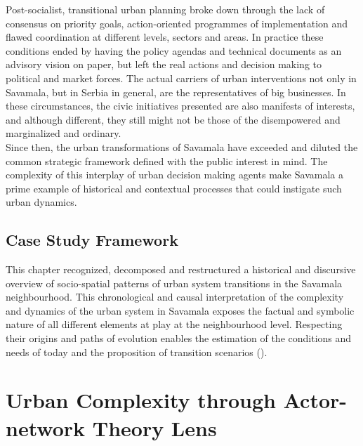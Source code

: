 \documentclass[11pt]{report}
\begin{document}
{{{{Post-socialist, transitional urban planning broke down through the lack of consensus on priority goals, action-oriented programmes of implementation and flawed coordination at different levels, sectors and areas. In practice these conditions ended by having the policy agendas and technical documents as an advisory vision on paper, but left the real actions and decision making to political and market forces. The actual carriers of urban interventions not only in Savamala, but in Serbia in general, are the representatives of big businesses. In these circumstances, the civic initiatives presented are also manifests of interests, and although different, they still might not be those of the disempowered and marginalized and ordinary.
\\

Since then, the urban transformations of Savamala have exceeded and diluted the common strategic framework defined with the public interest in mind.  The complexity of this interplay of urban decision making agents make Savamala a prime example of historical and contextual processes that could instigate such urban dynamics.

\section{Case Study Framework}

This chapter recognized, decomposed and restructured a historical and discursive overview of socio-spatial patterns of urban system transitions in the Savamala neighbourhood.
This chronological and causal interpretation of the complexity and dynamics of the urban system in Savamala exposes the factual and symbolic nature of all different elements at play at the neighbourhood level.
Respecting their origins and paths of evolution enables the estimation of the conditions and needs of today and the proposition of transition scenarios (\href{Grozdanic}{\citealt{grozdanic_belgrade_2008}}).



\chapter{Urban Complexity through Actor-network Theory Lens}

}}}}
\end{document}

